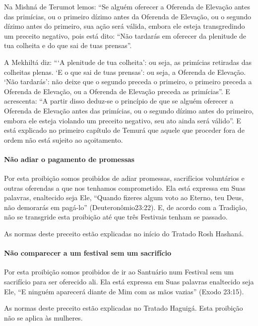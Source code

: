 Na Mishná de Terumot lemos: ``Se alguém oferecer a Oferenda de Elevação
antes das primícias, ou o primeiro dízimo antes da Oferenda de
Elevação, ou o segundo dízimo antes do primeiro, sua ação será válida,
embora ele esteja transgredindo um preceito negativo, pois está dito:
``Não tardarás em oferecer da plenitude de tua colheita e do que sai de
tuas prensas''.

A Mekhiltá diz: ```A plenitude de tua colheita': ou seja, as primícias
retiradas das colheitas plenas. `E o que sai de tuas prensas': ou seja,
a Oferenda de Elevação. `Não tardarás': não deixe que o segundo preceda
o primeiro, o primeiro preceda a Oferenda de Elevação, ou a Oferenda de
Elevação preceda as primícias''. E acrescenta: ``A partir disso deduz-se
o princípio de que se alguém oferecer a Oferenda de Elevação antes das
primícias, ou o segundo dízimo antes do primeiro, embora ele esteja
violando um preceito negativo, seu ato ainda será válido''. E está
explicado no primeiro capítulo de Temurá que aquele que proceder fora de
ordem não está sujeito ao açoitamento.

\paragraph{Não adiar o pagamento de promessas}

Por esta proibição somos proibidos de adiar promessas, sacrifícios
voluntários e outras oferendas a que nos tenhamos comprometido. Ela está
expressa em Suas palavras, enaltecido seja Ele, ``Quando fizeres algum
voto ao Eterno, teu Deus, não demorarás em pagá-lo''
(Deuteronômio23:22). E, de acordo com a Tradição, não se transgride
esta proibição até que três Festivais tenham se passado.

As normas deste preceito estão explicadas no início do Tratado Rosh Hashaná.

\paragraph{Não comparecer a um festival sem um sacrifício}

Por esta proibição somos proibidos de ir ao Santuário num Festival sem
um sacrifício para ser oferecido ali. Ela está expressa em Suas palavras
enaltecido seja Ele, ``E ninguém aparecerá diante de Mim com as mãos
vazias'' (Exodo 23:15).

As normas deste preceito estão explicadas no Tratado Haguigá. Esta
proibição não se aplica às mulheres.

